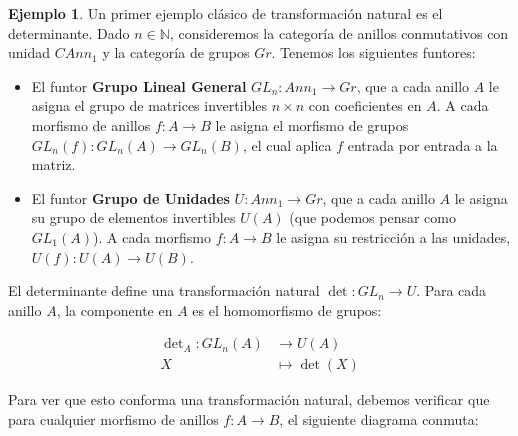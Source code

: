 \documentclass{article}
\theoremstyle{plain}
\theoremstyle{definition}
\newtheorem{ejemplo}[theorem]{Ejemplo}
\theoremstyle{remark}
\begin{document}
\begin{ejemplo}
    Un primer ejemplo clásico de transformación natural es el determinante. Dado $n \in \mathbb{N}$, consideremos la categoría de anillos conmutativos con unidad $CAnn_1$ y la categoría de grupos $Gr$. Tenemos los siguientes funtores:

    \begin{itemize}
        \item El funtor \textbf{Grupo Lineal General} $GL_n: Ann_1 \longrightarrow Gr$, que a cada anillo $A$ le asigna el grupo de matrices invertibles $n \times n$ con coeficientes en $A$. A cada morfismo de anillos $f: A \to B$ le asigna el morfismo de grupos $GL_n(f): GL_n(A) \to GL_n(B)$, el cual aplica $f$ entrada por entrada a la matriz.
        
        \item El funtor \textbf{Grupo de Unidades} $U: Ann_1 \longrightarrow Gr$, que a cada anillo $A$ le asigna su grupo de elementos invertibles $U(A)$ (que podemos pensar como $GL_1(A)$). A cada morfismo $f: A \to B$ le asigna su restricción a las unidades, $U(f): U(A) \to U(B)$.
    \end{itemize}

    El determinante define una transformación natural $\det: GL_n \to U$. Para cada anillo $A$, la componente en $A$ es el homomorfismo de grupos:

    \begin{align*}
        \det\nolimits_A: GL_n(A) &\longrightarrow U(A) \\
        X &\longmapsto \det(X)
    \end{align*}

    Para ver que esto conforma una transformación natural, debemos verificar que para cualquier morfismo de anillos $f: A \to B$, el siguiente diagrama conmuta:

    \begin{center}
    \end{center}


\end{ejemplo}
\end{document}
